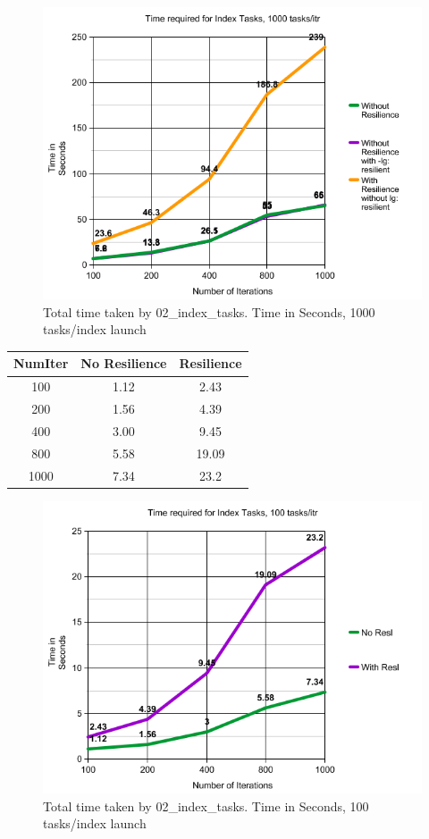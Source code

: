 \begin{figure}
\includegraphics[width=\textwidth]{images/index_tasks_time.png}
\caption{Total time taken by 02\_index\_tasks. Time in Seconds, 1000 tasks/index launch }
\end{figure}

\begin{center}
 \begin{tabular}{||c | | c | c ||} 
 \hline
 NumIter& No Resilience & Resilience \\ [0.25ex] 
 \hline\hline
100 &  1.12 & 2.43\\ 
 \hline
200 &  1.56 & 4.39\\ 
 \hline
400 &  3.00 & 9.45\\ 
 \hline
800 &  5.58 & 19.09\\ 
 \hline
1000 &  7.34 & 23.2 \\ [1ex] 
 \hline
\end{tabular}
\end{center}

\begin{figure}
\includegraphics[width=\textwidth]{images/index_tasks_time2.png}
\caption{Total time taken by 02\_index\_tasks. Time in Seconds, 100 tasks/index launch }
\end{figure}




